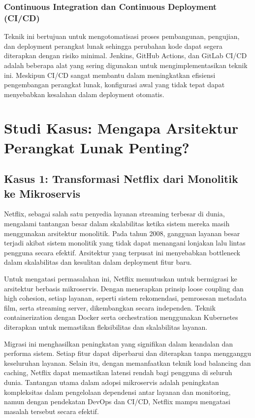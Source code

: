 \subsubsection{Continuous Integration dan Continuous Deployment (CI/CD)}
Teknik ini bertujuan untuk mengotomatisasi proses pembangunan, pengujian, dan deployment perangkat lunak sehingga perubahan kode dapat segera diterapkan dengan risiko minimal. Jenkins, GitHub Actions, dan GitLab CI/CD adalah beberapa alat yang sering digunakan untuk mengimplementasikan teknik ini. Meskipun CI/CD sangat membantu dalam meningkatkan efisiensi pengembangan perangkat lunak, konfigurasi awal yang tidak tepat dapat menyebabkan kesalahan dalam deployment otomatis.


\section{Studi Kasus: Mengapa Arsitektur Perangkat Lunak Penting?}

\subsection{Kasus 1: Transformasi Netflix dari Monolitik ke Mikroservis}

Netflix, sebagai salah satu penyedia layanan streaming terbesar di dunia, mengalami tantangan besar dalam skalabilitas ketika sistem mereka masih menggunakan arsitektur monolitik. Pada tahun 2008, gangguan layanan besar terjadi akibat sistem monolitik yang tidak dapat menangani lonjakan lalu lintas pengguna secara efektif. Arsitektur yang terpusat ini menyebabkan bottleneck dalam skalabilitas dan kesulitan dalam deployment fitur baru.

Untuk mengatasi permasalahan ini, Netflix memutuskan untuk bermigrasi ke arsitektur berbasis mikroservis. Dengan menerapkan prinsip loose coupling dan high cohesion, setiap layanan, seperti sistem rekomendasi, pemrosesan metadata film, serta streaming server, dikembangkan secara independen. Teknik containerization dengan Docker serta orchestration menggunakan Kubernetes diterapkan untuk memastikan fleksibilitas dan skalabilitas layanan.

Migrasi ini menghasilkan peningkatan yang signifikan dalam keandalan dan performa sistem. Setiap fitur dapat diperbarui dan diterapkan tanpa mengganggu keseluruhan layanan. Selain itu, dengan memanfaatkan teknik load balancing dan caching, Netflix dapat memastikan latensi rendah bagi pengguna di seluruh dunia. Tantangan utama dalam adopsi mikroservis adalah peningkatan kompleksitas dalam pengelolaan dependensi antar layanan dan monitoring, namun dengan pendekatan DevOps dan CI/CD, Netflix mampu mengatasi masalah tersebut secara efektif.

